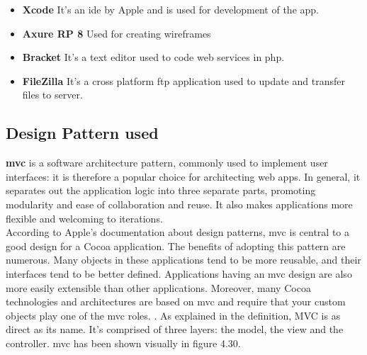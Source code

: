 \begin{itemize}
    \item \textbf{Xcode}
    It's an \gls{ide} by Apple and is used for development of the app. \\
    
    \item \textbf{Axure RP 8}
    Used for creating wireframes \\
    
    \item \textbf{Bracket}
    It's a text editor used to code web services in \gls{php}. \\
    
    \item \textbf{FileZilla}
    It's a cross platform \gls{ftp} application used to update and transfer files to server. \\
    
\end{itemize}


\subsection{Design Pattern used}


\textbf{\gls{mvc}} is a software architecture pattern, commonly used to implement user interfaces: it is therefore a popular choice for architecting web apps. In general, it separates out the application logic into three separate parts, promoting modularity and ease of collaboration and reuse. It also makes applications more flexible and welcoming to iterations. \cite{MVC} \\


According to Apple's documentation about design patterns, \gls{mvc} is central to a good design for a Cocoa application. The benefits of adopting this pattern are numerous. Many objects in these applications tend to be more reusable, and their interfaces tend to be better defined. Applications having an \gls{mvc} design are also more easily extensible than other applications. Moreover, many Cocoa technologies and architectures are based on \gls{mvc} and require that your custom objects play one of the \gls{mvc} roles. \cite{MVC_Apple}. As explained in the definition, MVC is as direct as its name. It's comprised of three layers: the model, the view and the controller. \gls{mvc} has been shown visually in figure 4.30.

